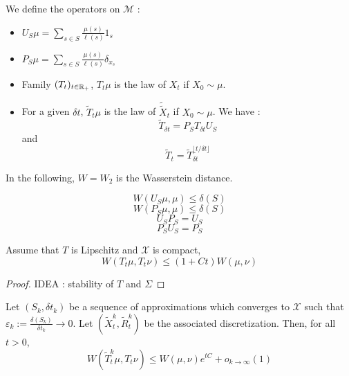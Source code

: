 \documentclass{article}
\begin{document}
We define the operators on $\mathcal{M}$ :
\begin{itemize}
\item $U_{S}\mu = \sum_{s \in S}\frac{\mu(s)}{\ell(s)}1_{s}$
\item $P_{S}\mu = \sum_{s \in S}\frac{\mu(s)}{\ell(s)}\delta_{x_{s}}$
\item Family $(T_{t})_{t\in \mathbb{R}_{+}}$, $T_{t}\mu$ is the law of $X_{t}$ if $X_{0}\sim \mu$.
\item For a given $\delta t$, $\tilde{T}_{t}\mu$ is the law of $\tilde{\tilde X}_{t}$ if $X_{0}\sim \mu$. We have :
  \begin{equation}
    \tilde{T}_{\delta t} = P_{S}T_{\delta t}U_{S}
  \end{equation}
  and
  \begin{equation}
    \tilde{T}_{t} = \tilde{T}_{\delta t}^{\lfloor t/\delta t\rfloor}
  \end{equation}
\end{itemize}
In the following, $W = W_{2}$ is the Wasserstein distance.
\begin{lemma}
  \begin{equation}
    W(U_{S}\mu, \mu) \leq \delta(S)
  \end{equation}
  \begin{equation}
    W(P_{S}\mu, \mu) \leq \delta(S)
  \end{equation}
  \begin{equation}
    U_{S}P_{S} = U_{S}
  \end{equation}
  \begin{equation}
    P_{S}U_{S} = P_{S}
  \end{equation}
\end{lemma}

\begin{lemma}
  Assume that $T$ is Lipschitz and $\mathcal{X}$ is compact, 
  \begin{equation}
    W(T_{t}\mu, T_{t}\nu) \leq (1+Ct)W(\mu, \nu)
  \end{equation}
\end{lemma}

\begin{proof}
   IDEA : stability of $T$ and $\Sigma$
\end{proof}

\begin{lemma}
   Let $(S_{k}, \delta t_{k})$ be a sequence of approximations which converges to $\mathcal{X}$ such that $\varepsilon_{k} := \frac{\delta(S_{k})}{\delta t_{k}} \rightarrow 0$. Let $(\tilde{X}^{k}_{t}, \tilde{R}^{k}_{t})$ be the associated discretization. Then, for all $t > 0$,
  \begin{equation}
    W(\tilde T^{k}_{t}\mu, T_{t}\nu) \leq W(\mu,\nu)e^{tC} + o_{k\rightarrow \infty}(1)
  \end{equation}
\end{lemma}
\end{document}
